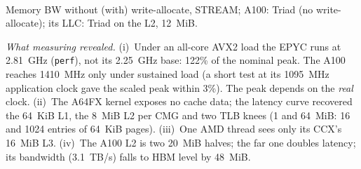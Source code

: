 \documentclass[conference,10pt]{IEEEtran}
\begin{document}
\begin{table}[!t]\centering\scriptsize
\caption{Platforms, FP32 per node (A100: per GPU): nominal / measured}\label{tab:hw}
\setlength{\tabcolsep}{1.6pt}
\\[1pt]
\raggedright\scriptsize Memory BW without (with) write-allocate, STREAM; A100: Triad (no write-allocate); its LLC: Triad on the L2, 12~MiB.
\end{table}

\emph{What measuring revealed.} (i)~Under an all-core AVX2 load the EPYC runs at 2.81~GHz
(\texttt{perf}), not its 2.25~GHz base: 122\% of the nominal peak. The A100 reaches 1410~MHz only
under sustained load (a short test at its 1095~MHz application clock gave the scaled peak within
3\%). The peak depends on the \emph{real} clock. (ii)~The A64FX
kernel exposes no cache data; the latency curve recovered the 64~KiB L1, the 8~MiB L2 per CMG and
two TLB knees (1 and 64~MiB: 16 and 1024 entries of 64~KiB pages). (iii)~One AMD thread sees only its CCX's 16~MiB L3. (iv)~The A100 L2 is two 20~MiB halves; the far one doubles latency; its bandwidth (3.1~TB/s) falls to HBM level by 48~MiB.
\end{document}
